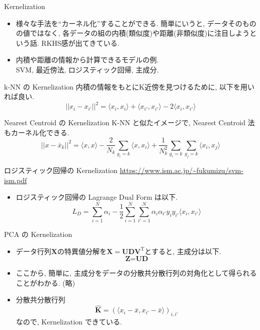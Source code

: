 \documentclass[dvipdfmx,8pt]{beamer}
\begin{document}
  \begin{frame}{Kernelization}
    \begin{itemize}
      \item 様々な手法を``カーネル化''することができる. 簡単にいうと, データそのものの値ではなく, 各データの組の内積(類似度)や距離(非類似度)に注目しようという話. RKHS感が出てきている.
      \item 内積や距離の情報から計算できるモデルの例.\\
        SVM, 最近傍法, ロジスティック回帰, 主成分.
    \end{itemize}
  \end{frame}
  \begin{frame}{k-NN の Kernelization}
    内積の情報をもとにK近傍を見つけるために, 以下を用いれば良い. 
    \[
      ||x_i-x_{i'}||^2=\langle x_i,x_i\rangle+\langle x_{i'},x_{i'}\rangle-2\langle x_i,x_{i'}\rangle
    \]
  \end{frame}
  \begin{frame}{Nearest Centroid の Kernelization}
    K-NN と似たイメージで,  Nearest Centroid 法もカーネル化できる. 
    \[
      ||x-\bar{x}_k||^2=\langle x,x\rangle-\frac{2}{N_k}\sum_{g_i=k}\langle x,x_i\rangle+\frac{1}{N_k^2}\sum_{g_i=k}\sum_{g_j=k}\langle x_i,x_j\rangle
    \]
  \end{frame}
  \begin{frame}{ロジスティック回帰の Kernelization}
    \url{https://www.ism.ac.jp/~fukumizu/svm-ism.pdf}
    \begin{itemize}
      \item ロジスティック回帰の Lagrange Dual Form は以下. 
        \[
          L_D=\sum_{i=1}^N\alpha_i-\frac{1}{2}\sum_{i=1}^N\sum_{i'=1}^N\alpha_i\alpha_{i'}y_iy_{i'}\langle x_i,x_{i'}\rangle
        \]
    \end{itemize}
  \end{frame}
  \begin{frame}{PCA の Kernelization}
    \begin{itemize}
      \item データ行列$\textbf{X}$の特異値分解を$\textbf{X}=\textbf{UDV}^{\mathrm{T}}$とすると, 主成分は以下. 
        \[
          \textbf{Z}=\textbf{UD}
        \]
      \item ここから, 簡単に, 主成分をデータの分散共分散行列の対角化として得られることがわかる. (略)
      \item 分散共分散行列
        \[
          \hat{\textbf{K}}=(\langle x_i-\bar{x}, x_{i'}-\bar{x}\rangle)_{i,i'}
        \]
        なので, Kernelization できている. 
    \end{itemize}
  \end{frame}
\end{document}
